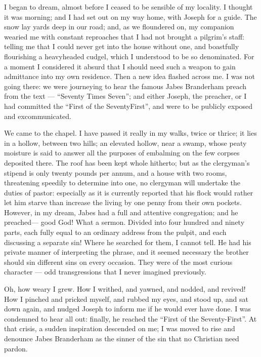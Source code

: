 \par I began to dream, almost before I ceased to be sensible of my locality. I thought it was morning; and I had set out on my way home, with Joseph for a guide. The snow lay yards deep in our road; and, as we floundered on, my companion wearied me with constant reproaches that I had not brought a pilgrim's staff: telling me that I could never get into the house without one, and boastfully flourishing a heavyheaded cudgel, which I understood to be so denominated. For a moment I considered it absurd that I should need such a weapon to gain admittance into my own residence. Then a new idea flashed across me. I was not going there: we were journeying to hear the famous Jabes Branderham preach from the text — “Seventy Times Seven”; and either Joseph, the preacher, or I had committed the “First of the SeventyFirst”, and were to be publicly exposed and excommunicated.
\par We came to the chapel. I have passed it really in my walks, twice or thrice; it lies in a hollow, between two hills; an elevated hollow, near a swamp, whose peaty moisture is said to answer all the purposes of embalming on the few corpses deposited there. The roof has been kept whole hitherto; but as the clergyman's stipend is only twenty pounds per annum, and a house with two rooms, threatening speedily to determine into one, no clergyman will undertake the duties of pastor: especially as it is currently reported that his flock would rather let him starve than increase the living by one penny from their own pockets. However, in my dream, Jabes had a full and attentive congregation; and he preached— good God! What a sermon. Divided into four hundred and ninety parts, each fully equal to an ordinary address from the pulpit, and each discussing a separate sin! Where he searched for them, I cannot tell. He had his private manner of interpreting the phrase, and it seemed necessary the brother should sin different sins on every occasion. They were of the most curious character — odd transgressions that I never imagined previously.
\par Oh, how weary I grew. How I writhed, and yawned, and nodded, and revived! How I pinched and pricked myself, and rubbed my eyes, and stood up, and sat down again, and nudged Joseph to inform me if he would ever have done. I was condemned to hear all out: finally, he reached the “First of the Seventy-First”. At that crisis, a sudden inspiration descended on me; I was moved to rise and denounce Jabes Branderham as the sinner of the sin that no Christian need pardon.
